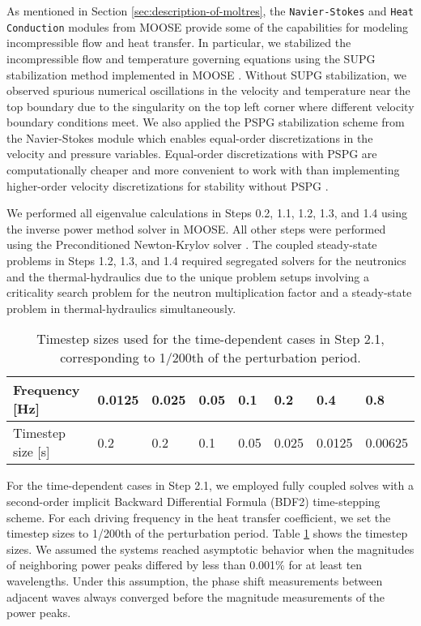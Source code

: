 As mentioned in Section \ref{sec:description-of-moltres}, the
\texttt{Navier-Stokes} and \texttt{Heat} \texttt{Conduction} modules from
\gls{MOOSE} provide some of the capabilities for
modeling incompressible flow and heat transfer. In particular, we stabilized
the incompressible flow and temperature governing equations using the
\gls{SUPG} stabilization method implemented in \gls{MOOSE}
\cite{peterson_overview_2018}. Without \gls{SUPG} stabilization, we
observed spurious numerical oscillations in the velocity and temperature near
the top boundary due to the singularity on the top left corner where different
velocity boundary conditions meet. We also applied the \gls{PSPG} stabilization
scheme \cite{hughes_new_1986} from the Navier-Stokes module
\cite{peterson_overview_2018}
which enables equal-order discretizations in the velocity and pressure
variables. Equal-order discretizations with \gls{PSPG} are computationally
cheaper and more convenient to work with than implementing higher-order
velocity discretizations for stability without \gls{PSPG}
\cite{chapelle_inf-sup_1993}.

We performed all eigenvalue calculations in Steps 0.2, 1.1, 1.2, 1.3, and 1.4
using the inverse power method solver in \gls{MOOSE}. All other steps
were performed using the Preconditioned Newton-Krylov solver
\cite{gaston_physics-based_2015}. The coupled steady-state problems in
Steps 1.2, 1.3, and 1.4 required segregated solvers for the neutronics
and the thermal-hydraulics due to the unique problem setups involving a
criticality search problem for the neutron multiplication factor
and a steady-state problem in thermal-hydraulics simultaneously.

\begin{table}[tb]
    \caption{Timestep sizes used for the time-dependent cases in
    Step 2.1, corresponding to 1/200th of the perturbation period.}
	\centering
	\setlength\tabcolsep{2.5pt}
	\begin{tabular}{l l l l l l l l}
	    \toprule
	    Frequency [Hz] & 0.0125 & 0.025 & 0.05 & 0.1 & 0.2 & 0.4 & 0.8 \\
	    \midrule
	    Timestep size [s] & 0.2 & 0.2 & 0.1 & 0.05 & 0.025 & 0.0125 & 0.00625
	    \\
	    \bottomrule
	\end{tabular}
	\label{table:timestep}
\end{table}

For the time-dependent cases in Step 2.1, we employed fully coupled solves with
a second-order implicit Backward Differential Formula (BDF2) time-stepping
scheme. For each driving frequency in the heat transfer coefficient, we set the
timestep sizes to 1/200th of the perturbation period. Table
\ref{table:timestep} shows the timestep sizes. We assumed the
systems reached asymptotic behavior when the magnitudes of neighboring power
peaks differed by less than 0.001\% for at least ten wavelengths. Under this
assumption, the phase shift measurements between adjacent waves always
converged before the magnitude measurements of the power peaks.

